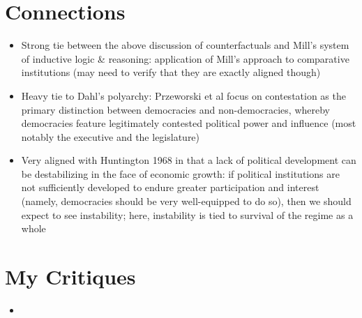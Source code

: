 \documentclass[12pt]{article}
\begin{document}
\section{Connections}

\begin{itemize}[leftmargin=*, itemsep=4pt]
    \item Strong tie between the above discussion of counterfactuals and Mill's system of inductive logic \& reasoning: application of Mill's approach to comparative institutions (may need to verify that they are exactly aligned though)
    \item Heavy tie to Dahl's polyarchy: Przeworski et al focus on contestation as the primary distinction between democracies and non-democracies, whereby democracies feature legitimately contested political power and influence (most notably the executive and the legislature)
    \item Very aligned with Huntington 1968 in that a lack of political development can be destabilizing in the face of economic growth: if political institutions are not sufficiently developed to endure greater participation and interest (namely, democracies should be very well-equipped to do so), then we should expect to see instability; here, instability is tied to survival of the regime as a whole
\end{itemize}


\section{My Critiques}

\begin{itemize}[leftmargin=*, itemsep=4pt]
    \item
\end{itemize}
\end{document}
